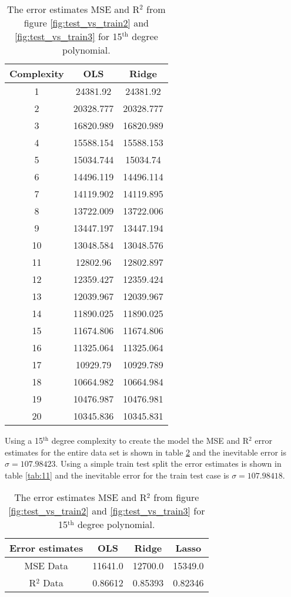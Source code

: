 \documentclass[uio,jmp,amsmath,amssymb,reprint,nofootinbib]{revtex4-1}
\numberwithin{equation}{section}
\begin{document}
\begin{table}
\begin{tabular}{|c|c|c|}\hline
Complexity & OLS & Ridge\\ \hline
1 & 24381.92 & 24381.92 \\ \hline
2 & 20328.777 & 20328.777 \\ \hline
3 & 16820.989 & 16820.989 \\ \hline
4 & 15588.154 & 15588.153 \\ \hline
5 & 15034.744 & 15034.74 \\ \hline
6 & 14496.119 & 14496.114 \\ \hline
7 & 14119.902 & 14119.895 \\ \hline
8 & 13722.009 & 13722.006 \\ \hline
9 & 13447.197 & 13447.194 \\ \hline
10 & 13048.584 & 13048.576 \\ \hline
11 & 12802.96 & 12802.897 \\ \hline
12 & 12359.427 & 12359.424 \\ \hline
13 & 12039.967 & 12039.967 \\ \hline
14 & 11890.025 & 11890.025 \\ \hline
15 & 11674.806 & 11674.806 \\ \hline
16 & 11325.064 & 11325.064 \\ \hline
17 & 10929.79 & 10929.789 \\ \hline
18 & 10664.982 & 10664.984 \\ \hline
19 & 10476.987 & 10476.981 \\ \hline
20 & 10345.836 & 10345.831 \\ \hline
\end{tabular}
\caption{The error estimates MSE and R\(^2\) from figure \ref{fig:test_vs_train2} and \ref{fig:test_vs_train3} for 15\(^\text{th}\) degree polynomial.}
\label{tab:13}
\end{table}

Using a 15\(^\text{th}\) degree complexity to create the model the MSE and R\(^2\) error estimates for the entire data set is shown in table \ref{tab:10} and the inevitable error is \(\sigma = 107.98423\). Using a simple train test split the error estimates is shown in table \ref{tab:11} and the inevitable error for the train test case is \(\sigma = 107.98418\).

\begin{table}
\begin{tabular}{|c|c|c|c|}\hline
Error estimates & OLS & Ridge & Lasso\\ \hline
MSE Data & 11641.0 & 12700.0 & 15349.0 \\ \hline
R\(^2\) Data & 0.86612 & 0.85393 & 0.82346 \\ \hline
\end{tabular}
\caption{The error estimates MSE and R\(^2\) from figure \ref{fig:test_vs_train2} and \ref{fig:test_vs_train3} for 15\(^\text{th}\) degree polynomial.}
\label{tab:10}
\end{table}
\end{document}
